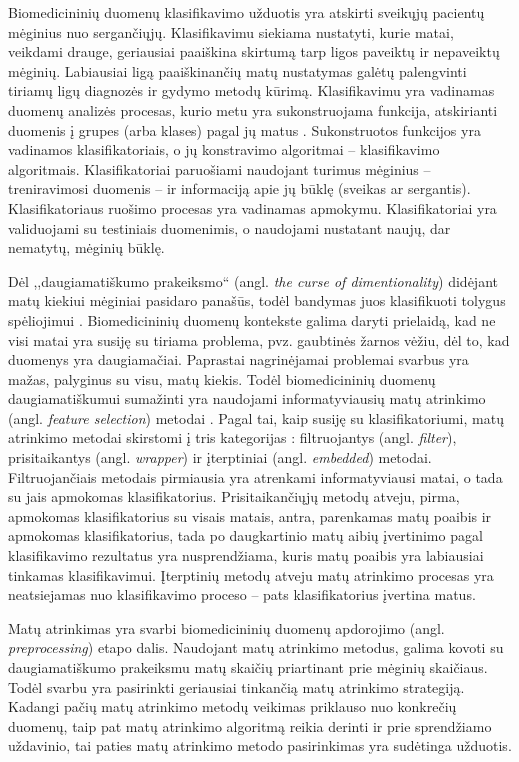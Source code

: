 Biomedicininių duomenų klasifikavimo užduotis yra atskirti sveikųjų pacientų mėginius nuo sergančiųjų. Klasifikavimu siekiama nustatyti, kurie matai, veikdami drauge, geriausiai paaiškina skirtumą tarp ligos paveiktų ir nepaveiktų mėginių. Labiausiai ligą paaiškinančių matų nustatymas galėtų palengvinti tiriamų ligų diagnozės ir gydymo metodų kūrimą. Klasifikavimu yra vadinamas duomenų analizės procesas, kurio metu yra sukonstruojama funkcija, atskirianti duomenis į grupes (arba klases) pagal jų matus \cite{fisher1936use}. Sukonstruotos funkcijos yra vadinamos klasifikatoriais, o jų konstravimo algoritmai -- klasifikavimo algoritmais. Klasifikatoriai paruošiami naudojant turimus mėginius -- treniravimosi duomenis -- ir informaciją apie jų būklę (sveikas ar sergantis). Klasifikatoriaus ruošimo procesas yra vadinamas apmokymu. Klasifikatoriai yra validuojami su testiniais duomenimis, o naudojami nustatant naujų, dar nematytų, mėginių būklę.

Dėl ,,daugiamatiškumo prakeiksmo`` (angl. \textit{the curse of dimentionality}) didėjant matų kiekiui mėginiai pasidaro panašūs, todėl bandymas juos klasifikuoti tolygus spėliojimui \cite{bellman1966adaptive}. Biomedicininių duomenų kontekste galima daryti prielaidą, kad ne visi matai yra susiję su tiriama problema, pvz. gaubtinės žarnos vėžiu, dėl to, kad duomenys yra daugiamačiai. Paprastai nagrinėjamai problemai svarbus yra mažas, palyginus su visu, matų kiekis.  Todėl biomedicininių duomenų daugiamatiškumui sumažinti yra naudojami informatyviausių matų atrinkimo (angl. \textit{feature selection}) metodai \cite{guyon2003introduction}. Pagal tai, kaip susiję su klasifikatoriumi, matų atrinkimo metodai skirstomi į tris kategorijas \cite{saeys2008robust}: filtruojantys (angl. \textit{filter}), prisitaikantys (angl. \textit{wrapper}) ir įterptiniai (angl. \textit{embedded}) metodai. Filtruojančiais metodais pirmiausia yra atrenkami informatyviausi matai, o tada su jais apmokomas klasifikatorius. 
Prisitaikančiųjų metodų atveju, pirma, apmokomas klasifikatorius su visais matais, antra, parenkamas matų poaibis ir apmokomas klasifikatorius, tada po daugkartinio matų aibių įvertinimo pagal klasifikavimo rezultatus yra nusprendžiama, kuris matų poaibis yra labiausiai tinkamas klasifikavimui. Įterptinių metodų atveju matų atrinkimo procesas yra neatsiejamas nuo klasifikavimo proceso -- pats klasifikatorius įvertina matus.

Matų atrinkimas yra svarbi biomedicininių duomenų apdorojimo (angl. \textit{preprocessing}) etapo dalis. Naudojant matų atrinkimo metodus, galima kovoti su daugiamatiškumo prakeiksmu matų skaičių priartinant prie mėginių skaičiaus. Todėl svarbu yra pasirinkti geriausiai tinkančią matų atrinkimo strategiją. Kadangi pačių matų atrinkimo metodų veikimas priklauso nuo konkrečių duomenų, taip pat matų atrinkimo algoritmą reikia derinti ir prie sprendžiamo uždavinio, tai paties matų atrinkimo metodo pasirinkimas yra sudėtinga užduotis. 

